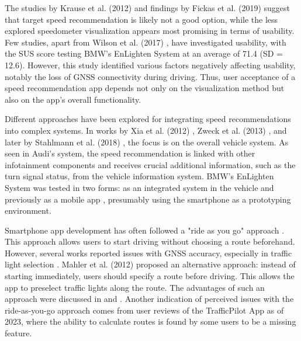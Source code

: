 The studies by Krause et al. (2012) \cite{krause_traffic_2012} and findings by Fickas et al. (2019) \cite{fickas_fast_2019} suggest that target speed recommendation is likely not a good option, while the less explored speedometer visualization appears most promising in terms of usability. Few studies, apart from Wilson et al. (2017) \cite{wilson_driver_2017}, have investigated usability, with the SUS score testing BMW's EnLighten System at an average of 71.4 (SD = 12.6). However, this study identified various factors negatively affecting usability, notably the loss of GNSS connectivity during driving. Thus, user acceptance of a speed recommendation app depends not only on the visualization method but also on the app's overall functionality.

Different approaches have been explored for integrating speed recommendations into complex systems. In works by Xia et al. (2012) \cite{xia_field_2012}, Zweck et al. (2013) \cite{zweck_traffic_2013}, and later by Stahlmann et al. (2018) \cite{stahlmann_exploring_2018}, the focus is on the overall vehicle system. As seen in Audi's system, the speed recommendation is linked with other infotainment components and receives crucial additional information, such as the turn signal status, from the vehicle information system. BMW's EnLighten System was tested in two forms: as an integrated system in the vehicle \cite{sokolov_effects_2018} and previously as a mobile app \cite{wilson_driver_2017}, presumably using the smartphone as a prototyping environment. 

Smartphone app development has often followed a "ride as you go" approach \cite{otto_operating_2010, koukoumidis_signalguru_2011, koukoumidis_leveraging_2012, bernais_design_2016, wilson_driver_2017, zhang_green_2020, khan_eco-drive_2021, yunex_traffic_v2x-kommunikation_2023}. This approach allows users to start driving without choosing a route beforehand. However, several works reported issues with GNSS accuracy, especially in traffic light selection \cite{wilson_driver_2017, stahlmann_exploring_2018, bhattacharyya_assessing_2022}. Mahler et al. (2012) \cite{mahler_reducing_2012} proposed an alternative approach: instead of starting immediately, users should specify a route before driving. This allows the app to preselect traffic lights along the route. The advantages of such an approach were discussed in  and . Another indication of perceived issues with the ride-as-you-go approach comes from user reviews of the TrafficPilot App as of 2023, where the ability to calculate routes is found by some users to be a missing feature.

